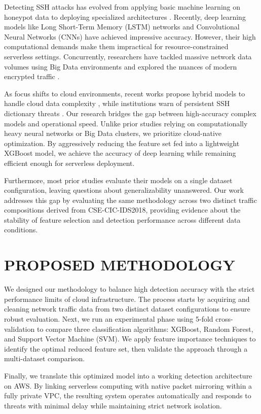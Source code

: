 \documentclass[conference]{IEEEtran}
\begin{document}
Detecting SSH attacks has evolved from applying basic machine learning on honeypot data \cite{b1, b2} to deploying specialized architectures \cite{b3, b7, b13}. Recently, deep learning models like Long Short-Term Memory (LSTM) networks \cite{b4} and Convolutional Neural Networks (CNNs) \cite{b6} have achieved impressive accuracy. However, their high computational demands make them impractical for resource-constrained serverless settings. Concurrently, researchers have tackled massive network data volumes using Big Data environments \cite{b5, b8} and explored the nuances of modern encrypted traffic \cite{b9, b10}.

As focus shifts to cloud environments, recent works propose hybrid models to handle cloud data complexity \cite{b12}, while institutions warn of persistent SSH dictionary threats \cite{b11}. Our research bridges the gap between high-accuracy complex models and operational speed. Unlike prior studies relying on computationally heavy neural networks or Big Data clusters, we prioritize cloud-native optimization. By aggressively reducing the feature set fed into a lightweight XGBoost model, we achieve the accuracy of deep learning while remaining efficient enough for serverless deployment.

Furthermore, most prior studies evaluate their models on a single dataset configuration, leaving questions about generalizability unanswered. Our work addresses this gap by evaluating the same methodology across two distinct traffic compositions derived from CSE-CIC-IDS2018, providing evidence about the stability of feature selection and detection performance across different data conditions.

\section{PROPOSED METHODOLOGY}

We designed our methodology to balance high detection accuracy with the strict performance limits of cloud infrastructure. The process starts by acquiring and cleaning network traffic data from two distinct dataset configurations to ensure robust evaluation. Next, we run an experimental phase using 5-fold cross-validation to compare three classification algorithms: XGBoost, Random Forest, and Support Vector Machine (SVM). We apply feature importance techniques to identify the optimal reduced feature set, then validate the approach through a multi-dataset comparison.

Finally, we translate this optimized model into a working detection architecture on AWS. By linking serverless computing with native packet mirroring within a fully private VPC, the resulting system operates automatically and responds to threats with minimal delay while maintaining strict network isolation.
\end{document}
